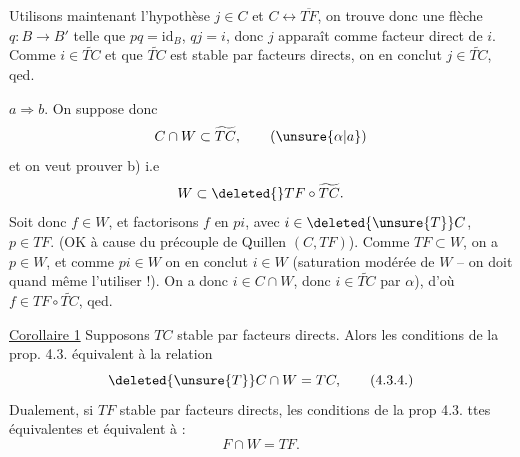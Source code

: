 

Utilisons maintenant l'hypothèse $j\in C$ et $C\longleftrightarrow\overline{TF}$,
on trouve donc  une flèche $q:B\to B'$ telle
que $pq=\mathrm{id}_B$, $qj=i$, donc $j$ apparaît comme
facteur direct de $i$. Comme $i\in\widetilde{TC}$ et que
$\widetilde{TC}$ est stable par facteurs directs, on en
conclut $j\in\widetilde{TC}$, qed.

$a\Rightarrow b$. On suppose donc
\[
C\cap W\subset\widetilde{TC},
\tag*{($\unsure{\alpha|a}$)}
\]
et on veut prouver b) i.e
\[
W\subset\deleted{\overline{\vphantom{TF}}}TF\circ\widetilde{TC}.
\]
Soit donc $f\in W$, et factorisons $f$ en $pi$, avec
$i\in\deleted{\unsure{T}}C$, $p\in TF$. (OK à cause du précouple de Quillen
$(C,TF)$). Comme $TF\subset W$, on a $p\in W$, et comme
$pi\in W$ on en conclut $i\in W$ (saturation
modérée de $W$ -- on doit quand même
l'utiliser !). On a donc $i\in C\cap W$, donc
$i\in\widetilde{TC}$ par $\alpha$), d'où $f\in TF\circ\widetilde{TC}$, qed.

\uline{Corollaire 1} Supposons $TC$ stable par facteurs directs.
\margin{$\Big|$}Alors  les conditions de la prop. 4.3. 
équivalent à la relation
\[
\deleted{\unsure{T}}C\cap W=TC,
\tag*{(4.3.4.)}
\]
\margin{$\Big|$}Dualement, si $TF$ stable par facteurs directs,
les conditions de la prop 4.3.  ttes équivalentes
et équivalent à :
\[
F\cap W=TF.
\tag*{(4.3.4$'$)}
\]
